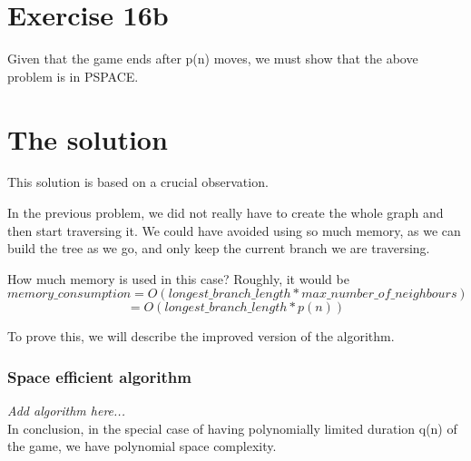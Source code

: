 \section*{Exercise 16b}

Given that the game ends after p(n) moves, we must show that the above problem
is in PSPACE.

\section*{The solution}

This solution is based on a crucial observation. 

In the previous problem, we did not really have to create the whole
graph and then start traversing it. We could have avoided using so much memory,
as we can build the tree as we go, and only keep the current branch we are
traversing. 

How much memory is used in this case? Roughly, it would be \[ memory\_consumption =O(longest\_branch\_length * max\_number\_of\_neighbours) \] \[=O(longest\_ branch\_length*p(n))\] 

To prove this, we will describe the improved version of the algorithm.

\subsubsection*{Space efficient algorithm}

\emph{Add algorithm here...} \\

In conclusion, in the special case of having polynomially limited duration q(n) of the game, we have polynomial space 
complexity.


